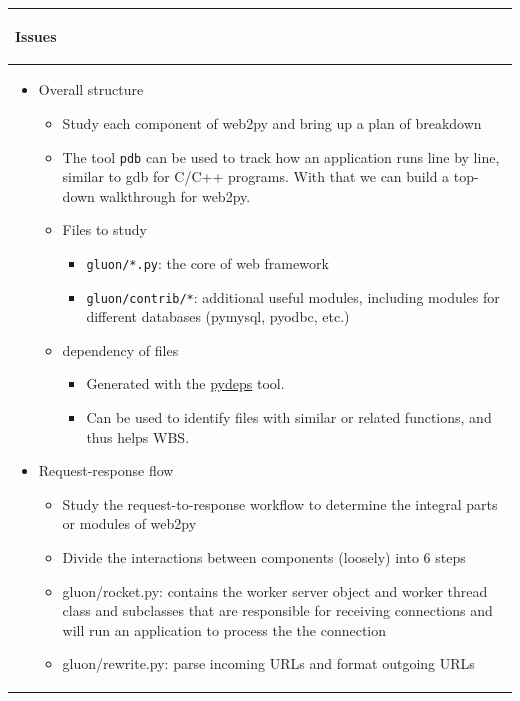 \documentclass{article}
\begin{document}
\begin{longtable}{|p{\textwidth}|}
\hline
\rowcolor{background}
\begin{center}
\vspace{-1.5em}\textbf{Issues}\vspace{-1em}
\end{center} \\
\hline
\endhead
\begin{itemize}
	\item Overall structure
	\begin{itemize}
		\item Study each component of web2py and bring up a plan of breakdown
		\item The tool \texttt{pdb} can be used to track how an application runs line by line, similar to gdb for C/C++ programs. With that we can build a top-down walkthrough for web2py.
		\item Files to study
		\begin{itemize}
			\item \texttt{gluon/*.py}: the core of web framework
			\item \texttt{gluon/contrib/*}: additional useful modules, including modules for different databases (pymysql, pyodbc, etc.)
		\end{itemize}
		\item dependency of files
		\begin{itemize}
			\item Generated with the \href{https://github.com/thebjorn/pydeps}{pydeps} tool.
			\item Can be used to identify files with similar or related functions, and thus helps WBS.
		\end{itemize}
	\end{itemize}
	\item Request-response flow
	\begin{itemize}
	    \item Study the request-to-response workflow to determine the integral parts or modules of web2py
	    \item Divide the interactions between components (loosely) into 6 steps
	    \item gluon/rocket.py: contains the worker server object and worker thread class and subclasses that are responsible for receiving connections and will run an application to process the the connection
	    \item gluon/rewrite.py: parse incoming URLs and format outgoing URLs

\end{itemize}
\end{itemize}
\end{longtable}
\end{document}
